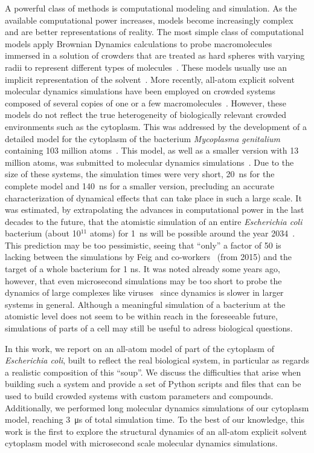 \documentclass[journal=jpcisd8,manuscript=article]{achemso}
\begin{document}
A powerful class of methods is computational modeling and simulation.
As the available computational power increases, models become
increasingly complex and are better representations of reality. The
most simple class of computational models apply Brownian Dynamics
calculations to probe macromolecules immersed in a solution of
crowders that are treated as hard spheres with varying radii to
represent different types of molecules~\cite{Ando2010}. These models
usually use an implicit representation of the
solvent~\cite{Mcguffee2010}. More recently, all-atom explicit solvent
molecular dynamics simulations have been employed on crowded systems
composed of several copies of one or a few
macromolecules~\cite{Wang2017c}. However, these models do not reflect
the true heterogeneity of biologically relevant crowded environments
such as the cytoplasm. This was addressed by the development of a
detailed model for the cytoplasm of the bacterium \textit{Mycoplasma
  genitalium} containing 103 million atoms~\cite{Feig2015}. This
model, as well as a smaller version with 13 million atoms, was
submitted to molecular dynamics simulations~\cite{Yu2016a}. Due to the
size of these systems, the simulation times were very short,
\SI{20}{\nano\second} for the complete model and
\SI{140}{\nano\second} for a smaller version, precluding an accurate
characterization of dynamical effects that can take place in such a
large scale. It was estimated, by extrapolating the advances in
computational power in the last decades to the future, that the
atomistic simulation of an entire \textit{Escherichia coli} bacterium
(about 10$^{11}$ atoms) for \SI{1}{\nano\second} will be possible
around the year 2034~\cite{vanGunsteren2006a}. This prediction may be
too pessimistic, seeing that ``only'' a factor of 50 is lacking
between the simulations by Feig and co-workers~\cite{Feig2015} (from
2015) and the target of a whole bacterium for 1 ns. It was noted
already some years ago, however, that even {microsecond} simulations
may be too short to probe the dynamics of large complexes like
viruses~\cite{Larsson2012a,Larsson2012b} since dynamics is slower in
larger systems in general. Although a meaningful simulation of a
bacterium at the atomistic level does not seem to be within reach in
the foreseeable future, simulations of parts of a cell may still be
useful to adress biological questions.

In this work, we report on an all-atom model of part of the cytoplasm
of \textit{Escherichia coli}, built to reflect the real biological
system, in particular as regards a realistic composition of this
``soup''. We discuss the difficulties that arise when building such a
system and provide a set of Python scripts and files that can be used
to build crowded systems with custom parameters and
compounds. Additionally, we performed long molecular dynamics
simulations of our cytoplasm model, reaching \SI{3}{\micro\second} of
total simulation time. To the best of our knowledge, this work is the
first to explore the structural dynamics of an all-atom explicit
solvent cytoplasm model with microsecond scale molecular dynamics
simulations.
\end{document}
